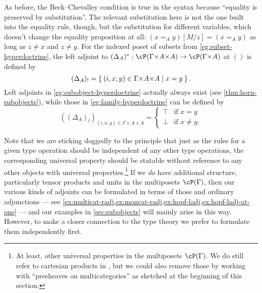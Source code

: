 As before, the Beck--Chevalley condition is true in the syntax because ``equality is preserved by substitution''.
The relevant substitution here is not the one built into the equality rule, though, but the substitution for different variables, which doesn't change the equality proposition at all: $(x=_A y)[M/z] = (x=_A y)$ as long as $z\neq x$ and $z\neq y$.
For the indexed poset of subsets from \cref{eg:subset-hyperdoctrine}, the left adjoint to $(\Delta_A)^* : \cP(\Gamma\times A\times A) \to \cP(\Gamma\times A)$ at $()$ is defined by
\[ (\Delta_A)_! = \setof{ (i,x,y)\in \Gamma\times A\times A | x=y }. \]
Left adjoints in \cref{eg:subobject-hyperdoctrine} actually always exist (see \cref{thm:horn-subobjects}), while those in \cref{eg:family-hyperdoctrine} can be defined by
\[ ((\Delta_A)_!)_{(i,x,y)\in \Gamma\times A\times A} =
\begin{cases}
  \top &\text{if } x=y\\
  \bot &\text{if } x\neq y.
\end{cases}
\]

Note that we are sticking doggedly to the principle that just as the rules for a given type operation should be independent of any other type operations, the corresponding universal property should be statable without reference to any other objects with universal properties.\footnote{At least, other universal properties in the multiposets $\cP(\Gamma)$.
We do still refer to cartesian products in \cS, but we could also remove those by working with ``presheaves on multicategories'' as sketched at the beginning of this section.}
If we \emph{do} have additional structure, particularly tensor products and units in the multiposets $\cP(\Gamma)$, then our various kinds of adjoints can be formulated in terms of those and ordinary adjunctions --- see \cref{ex:multicat-radj,ex:moncat-radj,ex:hopf-ladj,ex:hopf-ladj-at-one} --- and our examples in \cref{sec:subobjects} will mainly arise in this way.
However, to make a closer connection to the type theory we prefer to formulate them independently first.

